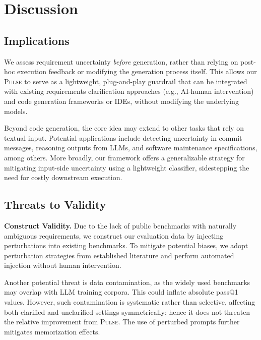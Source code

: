  \section{Discussion}
\label{sec:discussion}

\subsection{Implications}
We assess requirement uncertainty \emph{before} generation, rather than relying on post-hoc execution feedback or modifying the generation process itself. This allows our \textsc{Pulse} to serve as a lightweight, plug-and-play guardrail that can be integrated with existing requirements clarification approaches (e.g., AI-human intervention) and code generation frameworks or IDEs, without modifying the underlying models.

Beyond code generation, the core idea may extend to other tasks that rely on textual input. Potential applications include detecting uncertainty in commit messages, reasoning outputs from LLMs, and software maintenance specifications, among others. More broadly, our framework offers a generalizable strategy for mitigating input-side uncertainty using a lightweight classifier, sidestepping the need for costly downstream execution.


\subsection{Threats to Validity}
\label{subsec:threats}
\noindent\textbf{Construct Validity.} Due to the lack of public benchmarks with naturally ambiguous requirements, we construct our evaluation data by injecting perturbations into existing benchmarks. To mitigate potential biases, we adopt perturbation strategies from established literature and perform automated injection without human intervention. 

Another potential threat is data contamination, as the widely used benchmarks may overlap with LLM training corpora. This could inflate absolute pass@1 values. However, such contamination is systematic rather than selective, affecting both clarified and unclarified settings symmetrically; hence it does not threaten the relative improvement from \textsc{Pulse}. The use of perturbed prompts further mitigates memorization effects.

